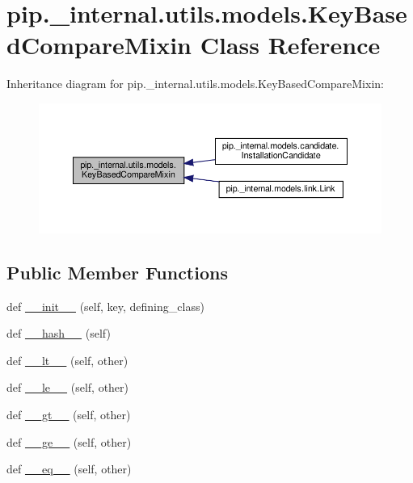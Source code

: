 \hypertarget{classpip_1_1__internal_1_1utils_1_1models_1_1KeyBasedCompareMixin}{}\section{pip.\+\_\+internal.\+utils.\+models.\+Key\+Based\+Compare\+Mixin Class Reference}
\label{classpip_1_1__internal_1_1utils_1_1models_1_1KeyBasedCompareMixin}


Inheritance diagram for pip.\+\_\+internal.\+utils.\+models.\+Key\+Based\+Compare\+Mixin\+:
\nopagebreak
\begin{figure}[H]
\begin{center}
\leavevmode
\includegraphics[width=350pt]{classpip_1_1__internal_1_1utils_1_1models_1_1KeyBasedCompareMixin__inherit__graph}
\end{center}
\end{figure}
\subsection*{Public Member Functions}
\begin{DoxyCompactItemize}
\item 
def \hyperlink{classpip_1_1__internal_1_1utils_1_1models_1_1KeyBasedCompareMixin_a59749fcbedb5e73297e45b4846bca90c}{\+\_\+\+\_\+init\+\_\+\+\_\+} (self, key, defining\+\_\+class)
\item 
def \hyperlink{classpip_1_1__internal_1_1utils_1_1models_1_1KeyBasedCompareMixin_aca7ac325973730012321319168db2117}{\+\_\+\+\_\+hash\+\_\+\+\_\+} (self)
\item 
def \hyperlink{classpip_1_1__internal_1_1utils_1_1models_1_1KeyBasedCompareMixin_a6052fe07f8b612f8d97667ab53859feb}{\+\_\+\+\_\+lt\+\_\+\+\_\+} (self, other)
\item 
def \hyperlink{classpip_1_1__internal_1_1utils_1_1models_1_1KeyBasedCompareMixin_af5bfe974250f0284e7d386cb90b64a21}{\+\_\+\+\_\+le\+\_\+\+\_\+} (self, other)
\item 
def \hyperlink{classpip_1_1__internal_1_1utils_1_1models_1_1KeyBasedCompareMixin_aa8ad30a60a69d7408cc8df46c9f68650}{\+\_\+\+\_\+gt\+\_\+\+\_\+} (self, other)
\item 
def \hyperlink{classpip_1_1__internal_1_1utils_1_1models_1_1KeyBasedCompareMixin_a4d9e9708f0991e969b9e5de9635cc19b}{\+\_\+\+\_\+ge\+\_\+\+\_\+} (self, other)
\item 
def \hyperlink{classpip_1_1__internal_1_1utils_1_1models_1_1KeyBasedCompareMixin_a004a091586eb35b2840278172a24904f}{\+\_\+\+\_\+eq\+\_\+\+\_\+} (self, other)
\end{DoxyCompactItemize}


